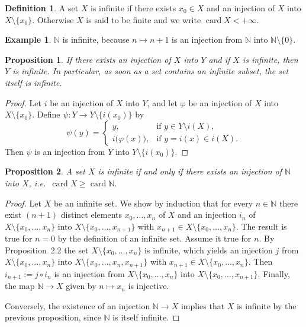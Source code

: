 \documentclass[11pt]{article}
\newtheorem{proposition}{Proposition}[section]
\theoremstyle{definition}
\newtheorem{definition}{Definition}[section]
\newtheorem{example}{Example}[section]
\begin{document}
\begin{definition}
A set $X$ is infinite if there exists $x_0\in X$ and an injection of $X$ into $X\setminus\{x_0\}$.
Otherwise $X$ is said to be finite and we write $\operatorname{card} X < +\infty$.
\end{definition}

\begin{example}
$\mathbb N$ is infinite, because $n\mapsto n+1$ is an injection from $\mathbb N$ into $\mathbb N\setminus\{0\}$.
\end{example}

\begin{proposition}
If there exists an injection of $X$ into $Y$ and if $X$ is infinite, then $Y$ is infinite.
In particular, as soon as a set contains an infinite subset, the set itself is infinite.
\end{proposition}

\begin{proof}
Let $i$ be an injection of $X$ into $Y$, and let $\varphi$ be an injection of $X$ into $X\setminus\{x_0\}$.
Define $\psi:Y\to Y\setminus\{i(x_0)\}$ by
\[
\psi(y)=
\begin{cases}
y, & \text{if } y\in Y\setminus i(X),\\
i\bigl(\varphi(x)\bigr), & \text{if } y=i(x)\in i(X).
\end{cases}
\]
Then $\psi$ is an injection from $Y$ into $Y\setminus\{i(x_0)\}$.
\end{proof}

\begin{proposition}
A set $X$ is infinite if and only if there exists an injection of $\mathbb N$ into $X$, i.e.\ $\operatorname{card} X \ge \operatorname{card}\mathbb N$.
\end{proposition}

\begin{proof}
Let $X$ be an infinite set.
We show by induction that for every $n\in\mathbb N$ there exist $(n+1)$ distinct elements $x_0,\dots,x_n$ of $X$ and an injection $i_n$ of $X\setminus\{x_0,\dots,x_n\}$ into $X\setminus\{x_0,\dots,x_{n+1}\}$ with $x_{n+1}\in X\setminus\{x_0,\dots,x_n\}$.
The result is true for $n=0$ by the definition of an infinite set.
Assume it true for $n$.
By Proposition~2.2 the set $X\setminus\{x_0,\dots,x_n\}$ is infinite, which yields an injection $j$ from $X\setminus\{x_0,\dots,x_n\}$ into $X\setminus\{x_0,\dots,x_n,x_{n+1}\}$ with $x_{n+1}\in X\setminus\{x_0,\dots,x_n\}$.
Then $i_{n+1}:=j\circ i_n$ is an injection from $X\setminus\{x_0,\dots,x_n\}$ into $X\setminus\{x_0,\dots,x_{n+1}\}$.
Finally, the map $\mathbb N\to X$ given by $n\mapsto x_n$ is injective.

Conversely, the existence of an injection $\mathbb N\to X$ implies that $X$ is infinite by the previous proposition, since $\mathbb N$ is itself infinite.
\end{proof}
\end{document}
